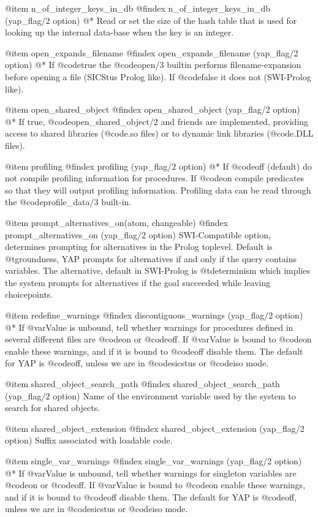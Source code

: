 {{{{{{{{@item n_of_integer_keys_in_db
@findex n_of_integer_keys_in_db (yap_flag/2 option)
@*
Read or set the size of the hash table that is used for looking up the
internal data-base when the key is an integer.

@item open_expands_filename
@findex open_expands_filename (yap_flag/2 option)
@*
If @code{true} the @code{open/3} builtin performs filename-expansion
before opening a file (SICStus Prolog like). If @code{false} it does not
(SWI-Prolog like).

@item open_shared_object
@findex open_shared_object (yap_flag/2 option)
@*
If true, @code{open_shared_object/2} and friends are implemented,
providing access to shared libraries (@code{.so} files) or to dynamic link
libraries (@code{.DLL} files).

@item  profiling
@findex profiling (yap_flag/2 option)
@*
If @code{off} (default) do not compile profiling information for
procedures. If @code{on} compile predicates so that they will output
profiling information. Profiling data can be read through the
@code{profile_data/3} built-in.

@item  prompt_alternatives_on(atom, changeable)
@findex  prompt_alternatives_on  (yap_flag/2 option)
SWI-Compatible option, determines prompting for alternatives in the Prolog toplevel. Default is @t{groundness}, YAP prompts for alternatives if and only if the query contains variables. The alternative, default in SWI-Prolog is @t{determinism} which implies the system prompts for alternatives if the goal succeeded while leaving choicepoints.


@item redefine_warnings
@findex discontiguous_warnings (yap_flag/2 option)
@*
If @var{Value} is unbound, tell whether warnings for procedures defined
in several different files are @code{on} or
@code{off}. If @var{Value} is bound to @code{on} enable these warnings,
and if it is bound to @code{off} disable them. The default for YAP is
@code{off}, unless we are in @code{sicstus} or @code{iso} mode.

@item shared_object_search_path
@findex shared_object_search_path (yap_flag/2 option)
Name of the environment variable used by the system to search for shared
objects.

@item shared_object_extension
@findex shared_object_extension (yap_flag/2 option)
Suffix associated with loadable code.

@item single_var_warnings
@findex single_var_warnings (yap_flag/2 option)
@*
If @var{Value} is unbound, tell whether warnings for singleton variables
are @code{on} or @code{off}. If @var{Value} is bound to @code{on} enable
these warnings, and if it is bound to @code{off} disable them. The
default for YAP is @code{off}, unless we are in @code{sicstus} or
@code{iso} mode.

}}}}}}}}

